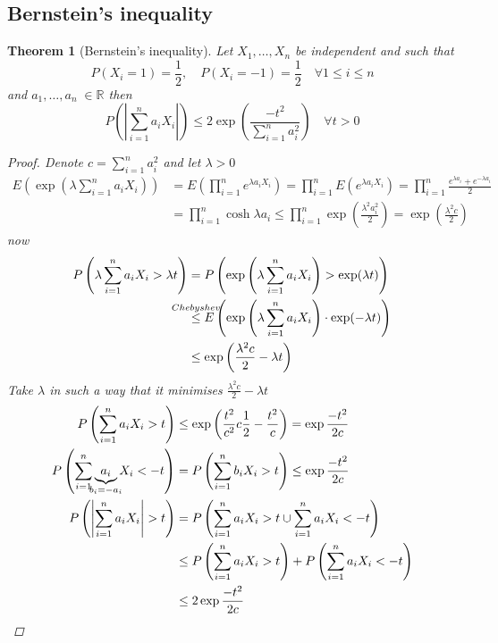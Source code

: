 \documentclass[12pt]{article}
\def\RR{\mathbb{R}}
\newtheorem{theorem}{Theorem}[section]
\begin{document}
\subsection{Bernstein’s inequality}
\begin{theorem}[Bernstein’s inequality]\label{bern}
Let $X_1 , \dots , X_n$ be independent and such that 
\[P(X_i=1)=\frac{1}{2}, \quad P(X_i=-1)=\frac{1}{2} \quad \forall 1\leq i \leq n \]
and $a_1, \dots , a_n \; \in \RR$ then
\[P\left(\left|\sum\limits_{i=1}^{n}a_iX_i\right|\right) \leq 2\exp\left(\frac{-t^2}{\sum\limits_{i=1}^{n}a_i^2}\right) \quad \forall t>0\]
\begin{proof}
Denote $c= \sum\limits_{i=1}^{n}a_i^2$ and let $\lambda >0$
\begin{align*} 
E\left(\exp{\left(\lambda\sum\limits_{i=1}^{n}a_iX_i\right)}\right)  &= E\left(\prod\limits_{i=1}^{n}e^{\lambda a_iX_i}\right) = \prod\limits_{i=1}^{n}E\left(e^{\lambda a_iX_i}\right) = \prod\limits_{i=1}^{n}\frac{e^{\lambda a_i} +e^{-\lambda a_i}}{2}\\  &=  \prod\limits_{i=1}^{n}\cosh{\lambda a_i} \leq \prod\limits_{i=1}^{n}\exp{\left(\frac{\lambda^2 a_i^2}{2}\right)} = \exp{\left(\frac{\lambda^2 c}{2}\right)}
\end{align*}
now
\begin{align*}
P\left(\lambda\sum\limits_{i=1}^{n}a_iX_i > \lambda t\right) &= P\left(\exp\left(\lambda\sum\limits_{i=1}^{n}a_iX_i\right) > \exp(\lambda t)\right) \\ &\overset{\mathclap{Chebyshev}}{\leq} E\left(\exp\left(\lambda\sum\limits_{i=1}^{n}a_iX_i\right)\cdot\exp(- \lambda t)\right) \\ &\leq \exp{\left(\frac{\lambda^2 c}{2} - \lambda t\right)}\end{align*}
Take $\lambda$ in such a way that it minimises $\frac{\lambda^2 c}{2} - \lambda t$
\begin{align*}
P\left(\sum\limits_{i=1}^{n}a_iX_i >  t\right) &\leq \exp{\left(\frac{t^2}{c^2}c\frac{1}{2} -\frac{t^2}{c}\right)} = \exp{\frac{-t^2}{2c}}\\
P\left(\sum\limits_{i=1}^{n}\underbrace{a_i}_{\mathclap{b_i = -a_i}}X_i < - t\right) &= P\left(\sum\limits_{i=1}^{n}b_iX_i >  t\right) \leq \exp{\frac{-t^2}{2c}}\\
P\left(\left|\sum\limits_{i=1}^{n}a_iX_i \right| >  t\right) &= P \left(\sum\limits_{i=1}^{n}a_iX_i >  t \cup \sum\limits_{i=1}^{n}a_iX_i <  -t\right) \\ &\leq P \left(\sum\limits_{i=1}^{n}a_iX_i >  t \right) + P\left( \sum\limits_{i=1}^{n}a_iX_i <  -t\right)\\ &\leq 2\exp{\frac{-t^2}{2c}}
\end{align*}
\end{proof}
\end{theorem}
\end{document}
